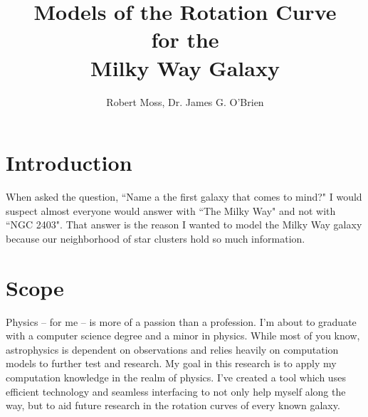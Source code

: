 \documentclass[titlepage]{article}
\begin{document}
\title{
\textbf{
Models of the Rotation Curve}
\protect\\
for the
\protect\\
\textbf{
Milky Way Galaxy}}

\author{Robert Moss, Dr. James G. O'Brien}
\maketitle

\newpage
\tableofcontents{} 
\newpage

\section{Introduction}
When asked the question, ``Name a the first galaxy that comes to mind?" I would suspect almost everyone would answer with ``The Milky Way" and not with ``NGC 2403". That answer is the reason I wanted to model the Milky Way galaxy because our neighborhood of star clusters hold so much information.

\section{Scope}
Physics -- for me -- is more of a passion than a profession. I'm about to graduate with a computer science degree and a minor in physics. While most of you know, astrophysics is dependent on observations and relies heavily on computation models to further test and research. My goal in this research is to apply my computation knowledge in the realm of physics. I've created a tool which uses efficient technology and seamless interfacing to not only help myself along the way, but to aid future research in the rotation curves of every known galaxy.
\end{document}

